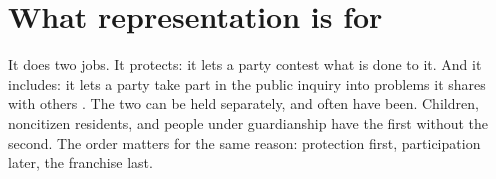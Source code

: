 \section{What representation is for}
\label{sec:33.1}
It does two jobs. It protects: it lets a party contest what is done to it. And it includes: it lets a party take part in the public inquiry into problems it shares with others \autocite{dewey1927public}. The two can be held separately, and often have been. Children, noncitizen residents, and people under guardianship have the first without the second. The order matters for the same reason: protection first, participation later, the franchise last.
